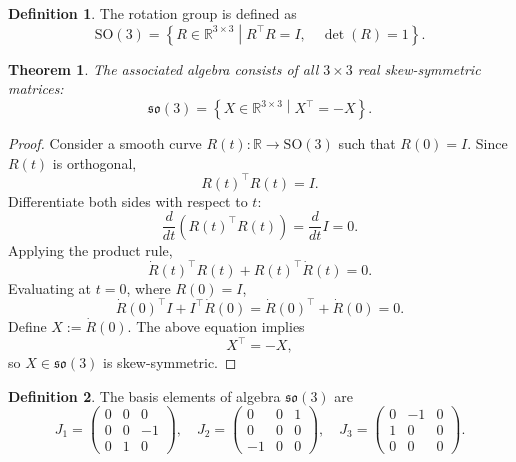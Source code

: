 \documentclass{amsart}
\newtheorem{theorem}{Theorem}[section]
\theoremstyle{definition}
\newtheorem{definition}{Definition}[theorem]
\theoremstyle{remark}
\begin{document}
\begin{definition}
  The rotation group is defined as
  \begin{equation*}
    \mathrm{SO}(3) = \left\{ R \in \mathbb{R}^{3 \times 3} \middle|
    R^\top R = I, \quad \det(R) = 1 \right\}.
  \end{equation*}
\end{definition}

\begin{theorem}\label{thm:so3_algebra_skew_symmetric}
  The associated algebra consists of all $3 \times 3$ real skew-symmetric matrices:
  \begin{equation*}
    \mathfrak{so}(3) = \left\{ X \in \mathbb{R}^{3 \times 3} \middle|
    X^\top = -X \right\}.
  \end{equation*}
\end{theorem}

\begin{proof}
  Consider a smooth curve $R(t): \mathbb{R} \to \mathrm{SO}(3)$ such that $R(0) = I$. Since $R(t)$ is orthogonal,
  \begin{equation*}
    R(t)^\top R(t) = I.
  \end{equation*}
  Differentiate both sides with respect to $t$:
  \begin{equation*}
    \frac{d}{dt} \left( R(t)^\top R(t) \right) = \frac{d}{dt} I = 0.
  \end{equation*}
  Applying the product rule,
  \begin{equation*}
    \dot{R}(t)^\top R(t) + R(t)^\top \dot{R}(t) = 0.
  \end{equation*}
  Evaluating at $t=0$, where $R(0) = I$,
  \begin{equation*}
    \dot{R}(0)^\top I + I^\top \dot{R}(0) = \dot{R}(0)^\top + \dot{R}(0) = 0.
  \end{equation*}
  Define $X := \dot{R}(0)$. The above equation implies
  \begin{equation*}
    X^\top = -X,
  \end{equation*}
  so $X \in \mathfrak{so}(3)$ is skew-symmetric.
\end{proof}

\begin{definition}
  The basis elements of algebra $\mathfrak{so}(3)$ are
  \begin{equation*}
    J_1 = \begin{pmatrix} 0 & 0 & 0 \\ 0 & 0 & -1 \\ 0 & 1 & 0 \end{pmatrix}, \quad
    J_2 = \begin{pmatrix} 0 & 0 & 1 \\ 0 & 0 & 0 \\ -1 & 0 & 0 \end{pmatrix}, \quad
    J_3 = \begin{pmatrix} 0 & -1 & 0 \\ 1 & 0 & 0 \\ 0 & 0 & 0 \end{pmatrix}.
  \end{equation*}
\end{definition}
\end{document}
